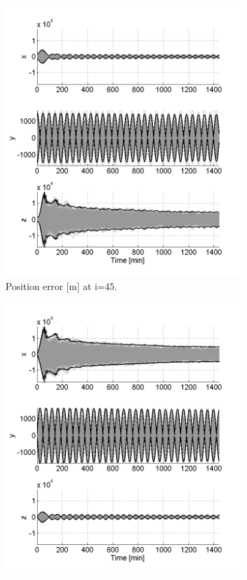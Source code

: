 \documentclass[]{aiaa-tc}%
\begin{document}
%
%
\begin{figure}[h!]
	\centering
	\begin{subfigure}{.49\textwidth}
		\centering
		\includegraphics{MC_pos45_500}
		\caption{Position error [m] at i=45\degree.}
		\label{fig:mcpos45_500}
	\end{subfigure}%
	\begin{subfigure}{.49\textwidth} 
		\centering
		\includegraphics{MC_vel45_500}

\end{subfigure}
\end{figure}
\end{document}
